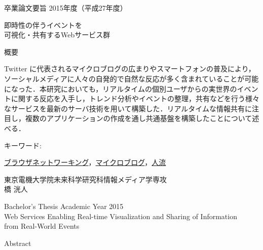 \newpage
\pagestyle{plain}
\begin{center}
\LARGE{卒業論文要旨 \hspace{10mm} 2015年度（平成27年度）}\\

\vspace{10mm}

\LARGE{即時性の伴うイベントを\\可視化・共有するWebサービス群}\\
\end{center}

\begin{center}
概要\\
\end{center}

Twitter に代表されるマイクロブログの広まりやスマートフォンの普及により，ソーシャルメディアに人々の自発的で自然な反応が多く含まれていることが可能になった．本研究においても，リアルタイムの個別ユーザからの実世界のイベントに関する反応を入手し，トレンド分析やイベントの整理，共有などを行う様々なサービスを最新のサーバ技術を用いて構築した．リアルタイムな情報共有に注目し，複数のアプリケーションの作成を通し共通基盤を構築したことについて述べる．

\begin{flushleft}キーワード:\\
\end{flushleft}
{\underline{ブラウザネットワーキング}，\underline{マイクロブログ}，\underline{人流}}


\begin{center}
\vspace{10mm}
\begin{flushright}\large 東京電機大学院未来科学研究科情報メディア学専攻\\
\LARGE {}橋 洸人\\
\end{flushright}
\end{center}

\newpage

\begin{center}
\LARGE{Bachelor's Thesis Academic Year 2015}\\

\vspace{10mm}
\LARGE{Web Services Enabling Real-time Visualization and Sharing of Information\\
from Real-World Events}\\
\end{center}
\begin{center}
Abstract\\
\end{center}

